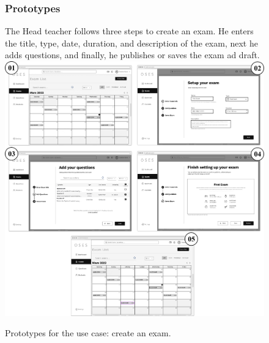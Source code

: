 \documentclass[]{uc2pfecaneva}
\begin{document}
    \begin{figure}
        \subsubsection{Prototypes}
        \raggedright The Head teacher follows three steps to create an exam. He enters the title, type, date, duration, and description of the exam, next he adds questions, and finally, he publishes or saves the exam ad draft.
        \linebreak
        \includegraphics[width=\textwidth]{images/prototypes_create_exam}

        \caption{Prototypes for the use case: create an exam.}
    \end{figure}
    \clearpage
\end{document}
